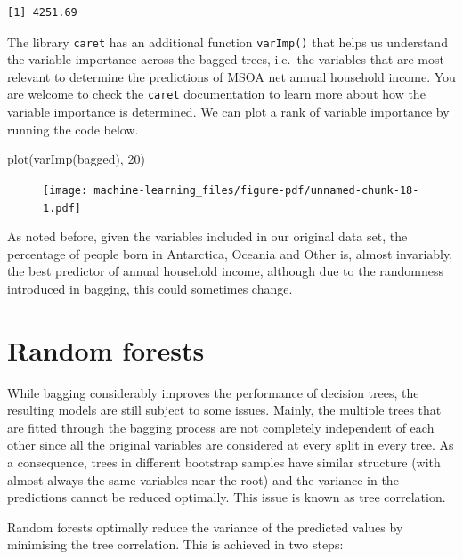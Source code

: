 \documentclass[
  letterpaper,
  DIV=11,
  numbers=noendperiod]{scrreprt}
\newenvironment{Shaded}{\begin{snugshade}}{\end{snugshade}}
\newcommand{\DecValTok}[1]{\textcolor[rgb]{0.68,0.00,0.00}{#1}}
\newcommand{\FunctionTok}[1]{\textcolor[rgb]{0.28,0.35,0.67}{#1}}
\newcommand{\NormalTok}[1]{\textcolor[rgb]{0.00,0.23,0.31}{#1}}
\begin{document}
\begin{verbatim}
[1] 4251.69
\end{verbatim}

The library \texttt{caret} has an additional function \texttt{varImp()}
that helps us understand the variable importance across the bagged
trees, i.e.~the variables that are most relevant to determine the
predictions of MSOA net annual household income. You are welcome to
check the \texttt{caret} documentation to learn more about how the
variable importance is determined. We can plot a rank of variable
importance by running the code below.

\begin{Shaded}
\begin{Highlighting}[]
\FunctionTok{plot}\NormalTok{(}\FunctionTok{varImp}\NormalTok{(bagged), }\DecValTok{20}\NormalTok{)}
\end{Highlighting}
\end{Shaded}

\begin{figure}[H]

{\centering \texttt{[image: machine-learning\_files/figure-pdf/unnamed-chunk-18-1.pdf]}

}

\end{figure}

As noted before, given the variables included in our original data set,
the percentage of people born in Antarctica, Oceania and Other is,
almost invariably, the best predictor of annual household income,
although due to the randomness introduced in bagging, this could
sometimes change.

\hypertarget{random-forests}{%
\section{Random forests}\label{random-forests}}

While bagging considerably improves the performance of decision trees,
the resulting models are still subject to some issues. Mainly, the
multiple trees that are fitted through the bagging process are not
completely independent of each other since all the original variables
are considered at every split in every tree. As a consequence, trees in
different bootstrap samples have similar structure (with almost always
the same variables near the root) and the variance in the predictions
cannot be reduced optimally. This issue is known as tree correlation.

Random forests optimally reduce the variance of the predicted values by
minimising the tree correlation. This is achieved in two steps:
\end{document}
